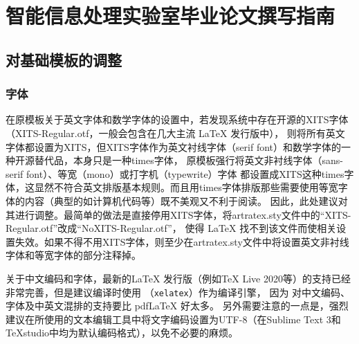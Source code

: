 
\newcommand*{\ltxcmdname}[1]{\texttt{\textbackslash #1}}
\newcommand*{\ltxenvname}[1]{\texttt{#1}}
\newcommand*{\dif}{\mathop{}\!\mathrm{d}}
\newcommand*{\tc}[1]{\multicolumn{1}{c|}{#1}} %

\newcommand*{\figref}[1]{图~\ref{#1}~}
\newcommand*{\secref}[1]{~\ref{#1}~节}
\newcommand*{\tabref}[1]{表~\ref{#1}~}
\newcommand*{\codref}[1]{程序~\ref{#1}~}
\newcommand*{\thmref}[1]{定理~\ref{#1}~}
\newcommand*{\axmref}[1]{公理~\ref{#1}~}
\newcommand*{\lemref}[1]{引理~\ref{#1}~}
\newcommand*{\prpref}[1]{命题~\ref{#1}~}
\newcommand*{\defref}[1]{定义~\ref{#1}~}

\newcommand*{\scite}[1]{~\cite{#1}~}
\newcommand*{\upcite}[1]{\textsuperscript{\cite{#1}}}

\chapter{智能信息处理实验室毕业论文撰写指南}

\section{对基础模板的调整}

\subsection{字体}
在原模板关于英文字体和数学字体的设置中，若发现系统中存在开源的XITS字体（XITS-Regular.otf，一般会包含在几大主流 \LaTeX{} 发行版中），
则将所有英文字体都设置为XITS，但XITS字体作为英文衬线字体（serif font）和数学字体的一种开源替代品，本身只是一种times字体，
原模板强行将英文非衬线字体（sans-serif font）、等宽（mono）或打字机（typewrite）字体
都设置成XITS这种times字体，这显然不符合英文排版基本规则。而且用times字体排版那些需要使用等宽字体的内容（典型的如计算机代码等）既不美观又不利于阅读。
因此，此处建议对其进行调整。最简单的做法是直接停用XITS字体，将artratex.sty文件中的“XITS-Regular.otf”改成“NoXITS-Regular.otf”，
使得 \LaTeX{} 找不到该文件而使相关设置失效。如果不得不用XITS字体，则至少在artratex.sty文件中将设置英文非衬线字体和等宽字体的部分注释掉。

关于中文编码和字体，最新的\LaTeX{} 发行版（例如TeX Live 2020等）的支持已经非常完善，但是建议编译时使用 \XeLaTeX{} （\texttt{xelatex}）作为编译引擎，
因为 \XeLaTeX{} 对中文编码、字体及中英文混排的支持要比 pdfLaTeX 好太多。
另外需要注意的一点是，强烈建议在所使用的文本编辑工具中将文字编码设置为UTF-8（在Sublime Text 3和TeXstudio中均为默认编码格式），以免不必要的麻烦。

